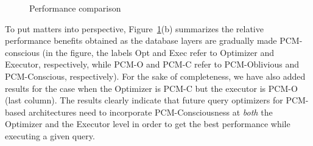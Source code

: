\begin{figure}[htbp]
\centering
	

\caption{Performance comparison}
\label{fig:perf_comp}
\end{figure}



To put matters into perspective, Figure~\ref{fig:perf_comp}(b) summarizes
the relative performance benefits obtained as the database layers are
gradually made PCM-conscious (in the figure, the labels Opt and Exec refer to Optimizer and Executor, respectively, while PCM-O and PCM-C
refer to PCM-Oblivious and PCM-Conscious, respectively). For the sake of completeness, we have also added results for the case when the Optimizer is PCM-C but the executor is PCM-O (last column). The results clearly indicate that future query optimizers for PCM-based architectures need to incorporate PCM-Consciousness at \emph{both} the Optimizer and the Executor level in order to get the best performance while executing a given query.




